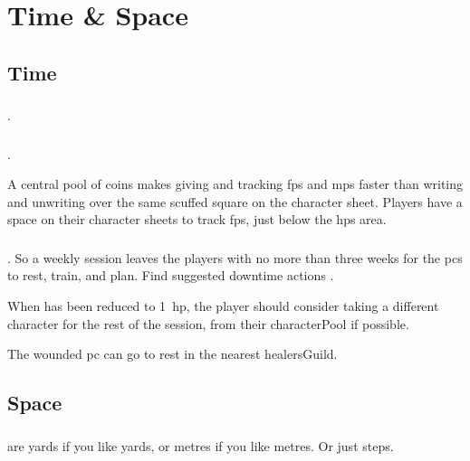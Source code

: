 \pagebreak[0]
\section{Time \& Space}

\begin{multicols}{2}

\subsection{Time}
\label{time}

\subsubsection{}
.


\subsubsection{}
.

A central pool of coins makes giving and tracking \glspl{fp} and \glspl{mp} faster than writing and unwriting over the same scuffed square on the character sheet.
Players have a space on their character sheets to track \glspl{fp}, just below the \glspl{hp} area.

\subsubsection{}
.
So a weekly session leaves the players with no more than three weeks for the \glspl{pc} to rest, train, and plan.
Find suggested \gls{downtime} actions .

\label{healing}
When  has been reduced to 1~\gls{hp}, the player should consider taking a different character for the rest of the session, from their \gls{characterPool} if possible.

The wounded \gls{pc} can go to rest in the nearest \gls{healersGuild}.

\subsection{Space}
\label{space}

\subsubsection{}
are yards if you like yards, or metres if you like metres.
Or just \glspl{step}.


\end{multicols}
